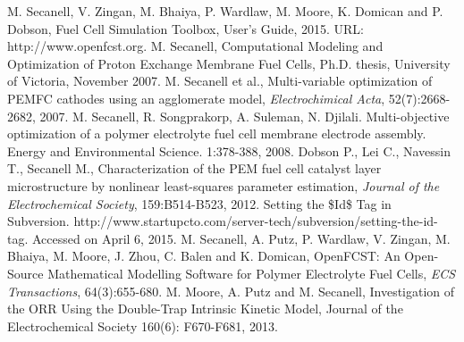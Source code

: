
\begin{thebibliography}{99}

 M. Secanell, V. Zingan, M. Bhaiya, P. Wardlaw, M. Moore, K. Domican and P. Dobson, Fuel Cell Simulation Toolbox, User's Guide, 2015. URL: http://www.openfcst.org.
 M. Secanell, Computational Modeling and Optimization of Proton Exchange Membrane Fuel Cells, Ph.D. thesis, University of Victoria, November 2007.
 M. Secanell et al., Multi-variable optimization of PEMFC cathodes using an agglomerate model, \textit{Electrochimical Acta}, 52(7):2668-2682, 2007.
 M. Secanell, R. Songprakorp, A. Suleman, N. Djilali.  Multi-objective optimization of a polymer electrolyte fuel cell membrane electrode assembly. Energy and Environmental Science. 1:378-388, 2008.
 Dobson P., Lei C., Navessin T., Secanell M., Characterization of the PEM fuel cell catalyst layer microstructure by nonlinear least-squares parameter estimation, \textit{Journal of the Electrochemical Society}, 159:B514-B523, 2012.
 Setting the \$Id\$ Tag in Subversion. http://www.startupcto.com/server-tech/subversion/setting-the-id-tag. Accessed on April 6, 2015.
 M. Secanell, A. Putz, P. Wardlaw, V. Zingan, M. Bhaiya, M. Moore, J. Zhou, C. Balen and K. Domican, OpenFCST: An Open-Source Mathematical Modelling Software for Polymer Electrolyte Fuel Cells, \textit{ECS Transactions}, 64(3):655-680.
 M. Moore, A. Putz and M. Secanell, Investigation of the ORR Using the Double-Trap Intrinsic Kinetic Model, Journal of the Electrochemical Society 160(6): F670-F681, 2013.

\end{thebibliography}



